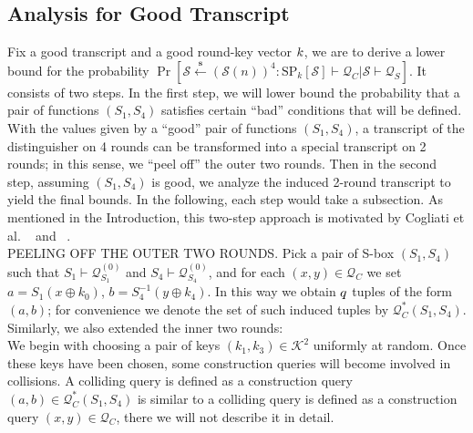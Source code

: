 \subsection{Analysis for Good Transcript}

\noindent Fix a good transcript and a good round-key vector $\mathnormal{k}$, we are to derive a lower bound for the probability  $\operatorname{Pr}\left[\mathcal{S} \stackrel{\mathbf{s}}{\leftarrow}(\mathcal{S}(n))^{4}: \mathrm{SP}_{k}[\mathcal{S}] \vdash \mathcal{Q}_{C} | \mathcal{S} \vdash \mathcal{Q}_{S}\right]$. It consists of two steps. In the first step, we will lower bound the probability that a pair of functions $(S_{1}, S_{4})$  satisfies certain ``bad'' conditions that will be defined. With the values given by a ``good'' pair of functions $(S_{1}, S_{4})$, a transcript of the distinguisher on 4 rounds can be transformed into a special transcript on 2 rounds; in this sense, we ``peel off'' the outer two rounds. Then in the second step, assuming $(S_{1}, S_{4})$ is good, we analyze the induced 2-round transcript to yield the final bounds. In the following, each step would take a subsection. As mentioned in the Introduction, this two-step approach is motivated by Cogliati et al.
~\cite{cogliati2015tweaking} and ~\cite{cogliati2015beyond}.\\

\noindent
\textsc{PEELING OFF THE OUTER TWO ROUNDS}. Pick a pair of S-box $(S_1, S_4)$ such that $S_{1} \vdash \mathcal{Q}_{S_{1}}^{(0)}$ and $S_{4} \vdash \mathcal{Q}_{S_{4}}^{(0)}$, and for each $ (x, y) \in \mathcal{Q}_{C}$ we set $a=S_{1}\left(x \oplus k_{0}\right)$, $b=S_{4}^{-1}\left(y \oplus k_{4}\right)$. In this way we obtain $\mathnormal{q}$ tuples of the form $(a,b)$; for convenience we denote the set of such induced tuples by $\mathcal{Q}_{C}^{*}\left(S_{1}, S_{4}\right)$. Similarly, we also extended the inner two rounds:\\
We begin with choosing a pair of keys $\left(k_{1}, k_{3}\right) \in \mathcal{K}^{2}$ uniformly at random. Once these keys have been chosen, some construction queries will become involved in collisions. A colliding query is defined as a construction query $(a, b) \in \mathcal{Q}_{C}^{*}\left(S_{1}, S_{4}\right)$ is similar to a colliding query is defined as a construction query $(x, y) \in \mathcal{Q}_{C}$, there we will not describe it in detail.\\

